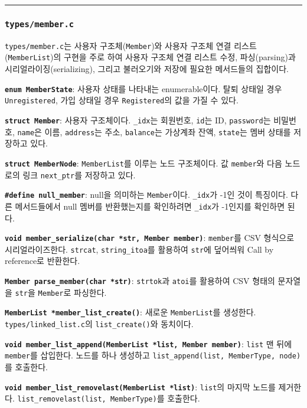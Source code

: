 \documentclass[runningheads]{llncs}
\begin{document}
\noindent\rule{2cm}{0.4pt}

\subsubsection{\texttt{types/member.c}}
\texttt{types/member.c}는 사용자 구조체(\texttt{Member})와 사용자 구조체 연결 리스트(\texttt{MemberList})의 구현을 주로 하여 사용자 구조체 연결 리스트 수정, 파싱(parsing)과 시리얼라이징(serializing), 그리고 불러오기와 저장에 필요한 메서드들의 집합이다.

\textbf{\texttt{enum MemberState}}: 사용자 상태를 나타내는 enumerable이다. 탈퇴 상태일 경우 \texttt{Unregistered}, 가입 상태일 경우 \texttt{Registered}의 값을 가질 수 있다.

\textbf{\texttt{struct Member}}: 사용자 구조체이다. \texttt{_idx}는 회원번호, \texttt{id}는 ID, \texttt{password}는 비밀번호, \texttt{name}은 이름, \texttt{address}는 주소, \texttt{balance}는 가상계좌 잔액, \texttt{state}는 멤버 상태를 저장하고 있다.

\textbf{\texttt{struct MemberNode}}: \texttt{MemberList}를 이루는 노드 구조체이다. 값 \texttt{member}와 다음 노드로의 링크 \texttt{next_ptr}를 저장하고 있다.

\textbf{\texttt{\#define null_member}}: null을 의미하는 \texttt{Member}이다. \texttt{_idx}가 -1인 것이 특징이다. 다른 메서드들에서 null 멤버를 반환했는지를 확인하려면 \texttt{_idx}가 -1인지를 확인하면 된다.

\textbf{\texttt{void member_serialize(char *str, Member member)}}: \texttt{member}를 CSV 형식으로 시리얼라이즈한다. \texttt{strcat}, \texttt{string_itoa}를 활용하여 \texttt{str}에 덮어씌워 Call by reference로 반환한다.

\textbf{\texttt{Member parse_member(char *str)}}: \texttt{strtok}과 \texttt{atoi}를 활용하여 CSV 형태의 문자열을 \texttt{str}을 \texttt{Member}로 파싱한다. 

\textbf{\texttt{MemberList *member_list_create()}}: 새로운 \texttt{MemberList}를 생성한다. \texttt{types/linked_list.c}의 \texttt{list_create()}와 동치이다.

\textbf{\texttt{void member_list_append(MemberList *list, Member member)}}: \texttt{list} 맨 뒤에 \texttt{member}를 삽입한다. 노드를 하나 생성하고 \texttt{list_append(list, MemberType, node)}를 호출한다.

\textbf{\texttt{void member_list_removelast(MemberList *list)}}: \texttt{list}의 마지막 노드를 제거한다. \texttt{list_removelast(list, MemberType)}를 호출한다.
\end{document}
